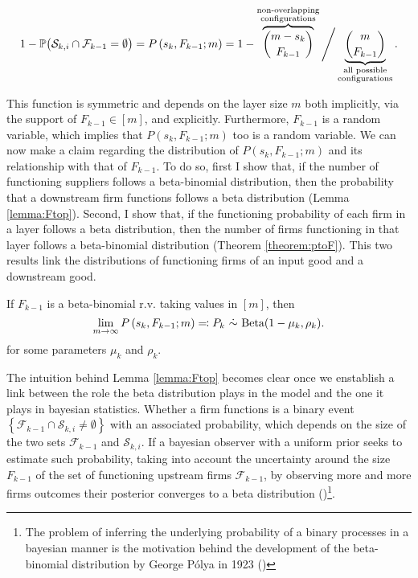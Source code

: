 \documentclass[../../main.tex]{subfiles}
\begin{document}
\begin{equation}
  1 - \P\big( \mathcal{S}_{k, i} \cap \mathcal{F}_{k - 1} = \emptyset \big) = P\left(s_k, F_{k - 1}; m\right) =  1 - \overbrace{\binom{m - s_k}{F_{k-1}}}^{\substack{\text{non-overlapping} \\ \text{configurations}}} \Bigg/ \underbrace{\binom{m}{F_{k-1}}}_{\substack{\text{all possible} \\ \text{configurations}}}. 
\end{equation}

This function is symmetric and depends on the layer size $m$ both implicitly, via the support of $F_{k - 1} \in [m]$, and explicitly. Furthermore, $F_{k - 1}$ is a random variable, which implies that $P(s_k, F_{k - 1}; m)$ too is a random variable. We can now make a claim regarding the distribution of $P(s_k, F_{k - 1}; m)$ and its relationship with that of $F_{k - 1}$. To do so, first I show that, if the number of functioning suppliers follows a beta-binomial distribution, then the probability that a downstream firm functions follows a beta distribution (Lemma \ref{lemma:Ftop}). Second, I show that, if the functioning probability of each firm in a layer follows a beta distribution, then the number of firms functioning in that layer follows a beta-binomial distribution (Theorem \ref{theorem:ptoF}). This two results link the distributions of functioning firms of an input good and a downstream good.

\begin{lemma} \label{lemma:Ftop}
  If $F_{k - 1}$ is a beta-binomial r.v. taking values in $[m]$, then \begin{equation*}\lim_{m \rightarrow \infty} P\left(s_k, F_{k - 1}; m\right) \eqqcolon P_k \ \dot{\sim} \ \Beta(1 - \mu_k, \rho_k).\end{equation*} for some parameters $\mu_k$ and $\rho_k$.
\end{lemma}

The intuition behind Lemma \ref{lemma:Ftop} becomes clear once we enstablish a link between the role the beta distribution plays in the model and the one it plays in bayesian statistics. Whether a firm functions is a binary event $\left\{\mathcal{F}_{k - 1} \cap \mathcal{S}_{k, i} \neq \emptyset \right\}$ with an associated probability, which depends on the size of the two sets $\mathcal{F}_{k - 1}$ and $\mathcal{S}_{k, i}$. If a bayesian observer with a uniform prior seeks to estimate such probability, taking into account the uncertainty around the size $F_{k - 1}$ of the set of functioning upstream firms $\mathcal{F}_{k - 1}$, by observing more and more firms outcomes their posterior converges to a beta distribution (\cite{gelman_bayesian_2004})\footnote{ The problem of inferring the underlying probability of a binary processes in a bayesian manner is the motivation behind the development of the beta-binomial distribution by George Pólya in 1923 (\cite{feller_introduction_1968}) }.
\end{document}
